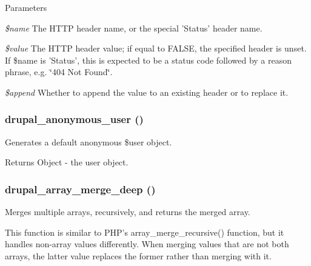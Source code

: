 \begin{DoxyParams}{Parameters}
\item[{\em \$name}]The HTTP header name, or the special 'Status' header name. \item[{\em \$value}]The HTTP header value; if equal to FALSE, the specified header is unset. If \$name is 'Status', this is expected to be a status code followed by a reason phrase, e.g. \char`\"{}404 Not Found\char`\"{}. \item[{\em \$append}]Whether to append the value to an existing header or to replace it. \end{DoxyParams}
\hypertarget{bootstrap_8inc_a9ad783f833f89bccb8ca03e960e3d33d}{
\subsubsection[{drupal\_\-anonymous\_\-user}]{\setlength{\rightskip}{0pt plus 5cm}drupal\_\-anonymous\_\-user ()}}
\label{bootstrap_8inc_a9ad783f833f89bccb8ca03e960e3d33d}
Generates a default anonymous \$user object.

\begin{DoxyReturn}{Returns}
Object -\/ the user object. 
\end{DoxyReturn}
\hypertarget{bootstrap_8inc_a4e822805ef55b0a271ab181c9620837a}{
\subsubsection[{drupal\_\-array\_\-merge\_\-deep}]{\setlength{\rightskip}{0pt plus 5cm}drupal\_\-array\_\-merge\_\-deep ()}}
\label{bootstrap_8inc_a4e822805ef55b0a271ab181c9620837a}
Merges multiple arrays, recursively, and returns the merged array.

This function is similar to PHP's array\_\-merge\_\-recursive() function, but it handles non-\/array values differently. When merging values that are not both arrays, the latter value replaces the former rather than merging with it.

